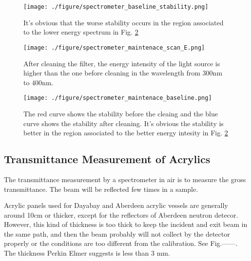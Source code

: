 \begin{figure}
    \centering
    \texttt{[image: ./figure/spectrometer\_baseline\_stability.png]}
    \caption[The spectrometer baseline stability]
{It's obvious that the worse stability occurs in the region associated to the lower energy spectrum in Fig. \ref{fig:spectrometer_maintenace_scan_E.png}}
    \label{fig:spectrometer_baseline_stability.png}
    \end{figure}


\begin{figure}
    \centering
    \texttt{[image: ./figure/spectrometer\_maintenace\_scan\_E.png]}
    \caption[The energy spectrum of the light source of Lambda 650]
{
After cleaning the filter, the energy intensity of the light source is higher than the one before cleaning in the wavelength from 300nm to 400nm.
}
    \label{fig:spectrometer_maintenace_scan_E.png}
    \end{figure}


\begin{figure}
    \centering
    \texttt{[image: ./figure/spectrometer\_maintenace\_baseline.png]}
    \caption[The spectrometer baseline stability before and after cleaing the filter]
{
The red curve shows the stability before the cleaing and the blue curve shows the stability after cleaning.
It's obvious the stability is better in the region associated to the better energy intesity in Fig. \ref{fig:spectrometer_maintenace_scan_E.png}
}
    \label{fig:spectrometer_maintenace_baseline.png}
    \end{figure}




\subsection{Transmittance Measurement of Acrylics}

The transmittance measurement by a spectrometer in air is to measure the gross transmittance.
The beam will be reflected few times in a sample.

Acrylic panels used for Dayabay and Aberdeen acrylic vessels
are generally around 10cm or thicker, except for the reflectors of Aberdeen
neutron detecor. However, this kind of thickness is too thick to
keep the incident and exit beam in the same path, and then
the beam probably will not collect by the detector properly or
the conditions are too different from the calibration. See Fig.------.
The thickness Perkin Elmer suggests is less than 3 mm.


